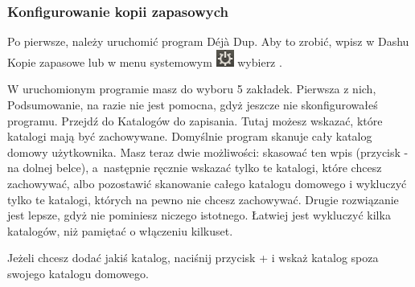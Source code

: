 \subsubsection{Konfigurowanie kopii zapasowych}
Po pierwsze, należy uruchomić program Déjà Dup. Aby to zrobić, wpisz w Dashu \textcolor{ubuntu_orange}{Kopie zapasowe} lub w menu systemowym \includegraphics{images/ikony_zasilanie.png} wybierz .

W uruchomionym programie masz do wyboru 5 zakładek. Pierwsza z nich, \textcolor{ubuntu_orange}{Podsumowanie}, na razie nie jest pomocna, gdyż jeszcze nie skonfigurowałeś programu. Przejdź do \textcolor{ubuntu_orange}{Katalogów do zapisania}. Tutaj możesz wskazać, które katalogi mają być zachowywane. Domyślnie program skanuje cały katalog domowy użytkownika. Masz teraz dwie możliwości: skasować ten wpis (przycisk \textcolor{ubuntu_orange}{-} na dolnej belce), a~następnie ręcznie wskazać tylko te katalogi, które chcesz zachowywać, albo pozostawić skanowanie całego katalogu domowego i wykluczyć tylko te katalogi, których na pewno nie chcesz zachowywać. Drugie rozwiązanie jest lepsze, gdyż nie pominiesz niczego istotnego. Łatwiej jest wykluczyć kilka katalogów, niż pamiętać o włączeniu kilkuset.

Jeżeli chcesz dodać jakiś katalog, naciśnij przycisk \textcolor{ubuntu_orange}{+} i wskaż katalog spoza swojego katalogu domowego.

